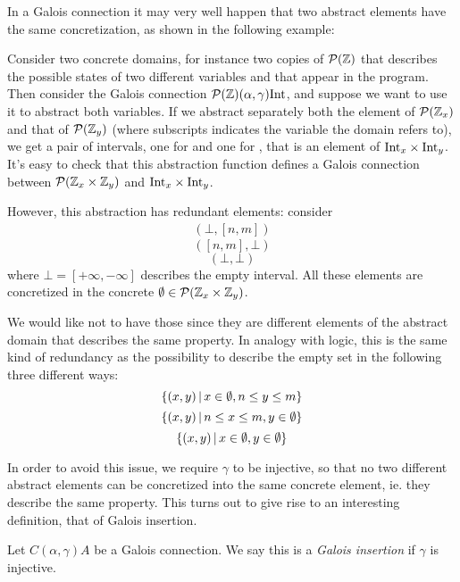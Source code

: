 In a Galois connection it may very well happen that two abstract elements have the same concretization, as shown in the following example:
\begin{example}
	Consider two concrete domains, for instance two copies of $\mathcal{P}(\mathbb{Z})$ that describes the possible states of two different variables  and  that appear in the program.
	Then consider the Galois connection $\mathcal{P}(\mathbb{Z}) (\alpha, \gamma) \text{Int}$, and suppose we want to use it to abstract both variables. If we abstract separately both the element of $\mathcal{P}(\mathbb{Z}_x)$ and that of $\mathcal{P}(\mathbb{Z}_y)$ (where subscripts indicates the variable the domain refers to), we get a pair of intervals, one for  and one for , that is an element of $\text{Int}_x \times \text{Int}_y$. It's easy to check that this abstraction function defines a Galois connection between $\mathcal{P}(\mathbb{Z}_x \times \mathbb{Z}_y)$ and $\text{Int}_x \times \text{Int}_y$.
	
	However, this abstraction has redundant elements: consider
	\begin{align*}
		(\bot, [n, m])
	\end{align*}
	\[ ([n, m], \bot) \]
	\[ (\bot, \bot) \]
	where $\bot = [+\infty, -\infty]$ describes the empty interval. All these elements are concretized in the concrete $\emptyset \in \mathcal{P}(\mathbb{Z}_x \times \mathbb{Z}_y)$.
\end{example}

We would like not to have those since they are different elements of the abstract domain that describes the same property. In analogy with logic, this is the same kind of redundancy as the possibility to describe the empty set in the following three different ways:
\[
\{ (x, y) \,\vert\, x \in \emptyset, n \le y \le m \}
\]
\[
\{ (x, y) \,\vert\, n \le x \le m, y \in \emptyset \}
\]
\[
\{ (x, y) \,\vert\, x \in \emptyset, y \in \emptyset \}
\]

In order to avoid this issue, we require $\gamma$ to be injective, so that no two different abstract elements can be concretized into the same concrete element, ie. they describe the same property. This turns out to give rise to an interesting definition, that of Galois insertion.
\begin{definition}\label{ch2:def:gi}
	Let $C (\alpha, \gamma) A$ be a Galois connection. We say this is a \textit{Galois insertion} if $\gamma$ is injective.
\end{definition}


